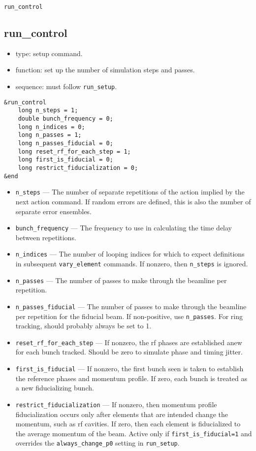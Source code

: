\documentclass[11pt]{article}
\begin{document}
\newpage
\begin{center}{\Large\verb|run_control|}\end{center}
\subsection{run\_control \label{subsec:runcontrol}}

\begin{itemize}
\item type: setup command.
\item function: set up the number of simulation steps and passes.
\item sequence: must follow \verb|run_setup|.
\end{itemize}

\begin{verbatim}
&run_control
    long n_steps = 1;
    double bunch_frequency = 0;
    long n_indices = 0;
    long n_passes = 1;
    long n_passes_fiducial = 0;
    long reset_rf_for_each_step = 1;
    long first_is_fiducial = 0;
    long restrict_fiducialization = 0;
&end
\end{verbatim}

\begin{itemize}
\item \verb|n_steps| --- The number of separate repetitions of the action implied by the next action command.
If random errors are defined, this is also the number of separate error ensembles.
\item \verb|bunch_frequency| --- The frequency to use in calculating the time delay between repetitions.
\item \verb|n_indices| --- The number of looping indices for which to expect definitions in subsequent \verb|vary_element| commands.  If nonzero, then \verb|n_steps| is ignored.
\item \verb|n_passes| --- The number of passes to make through the beamline per repetition.
\item \verb|n_passes_fiducial| --- The number of passes to make through the beamline per repetition for the fiducial beam. If non-positive, use \verb|n_passes|.
  For ring tracking, should probably always be set to 1.
\item \verb|reset_rf_for_each_step| --- If nonzero, the rf phases are 
established anew for each bunch tracked.  Should be zero to simulate
phase and timing jitter. 
\item \verb|first_is_fiducial| --- If nonzero, the first bunch seen is taken
to establish the reference phases and momentum profile.  If zero, each bunch
is treated as a new fiducializing bunch.
\item \verb|restrict_fiducialization| --- If nonzero, then  momentum profile
fiducialization occurs only after elements that are intended
change the momentum, such as rf cavities.  If zero, then each element is
fiducialized to the average momentum of the beam.
Active only if \verb|first_is_fiducial=1| and overrides the \verb|always_change_p0| setting 
in \verb|run_setup|.
\end{itemize}
\end{document}
